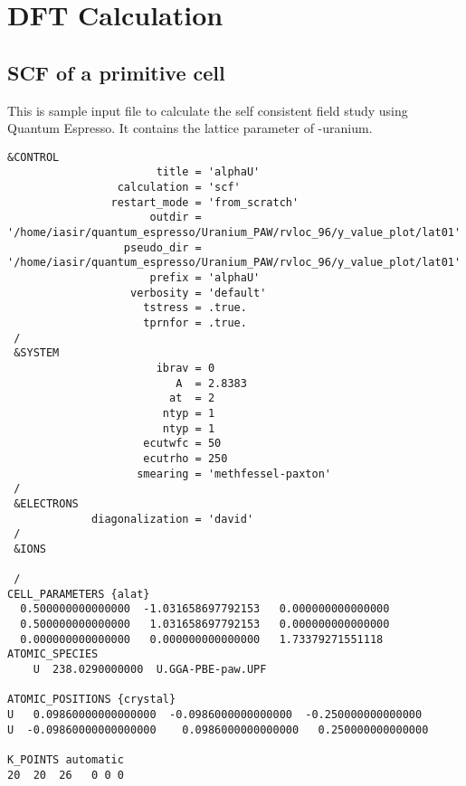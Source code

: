 \section{DFT Calculation}
\subsection{SCF of a primitive cell}
This is sample input file to calculate the self consistent field study using Quantum Espresso. It contains the lattice parameter of \textalpha-uranium.
\lstset{style=deflt}
\begin{lstlisting}
&CONTROL
                       title = 'alphaU'
                 calculation = 'scf'
                restart_mode = 'from_scratch'
                      outdir = '/home/iasir/quantum_espresso/Uranium_PAW/rvloc_96/y_value_plot/lat01'
                  pseudo_dir = '/home/iasir/quantum_espresso/Uranium_PAW/rvloc_96/y_value_plot/lat01'
                      prefix = 'alphaU'
                   verbosity = 'default'
                     tstress = .true.
                     tprnfor = .true.
 /
 &SYSTEM
                       ibrav = 0 
                          A  = 2.8383
                         at  = 2 
                        ntyp = 1 
                        ntyp = 1 
                     ecutwfc = 50
                     ecutrho = 250 
                    smearing = 'methfessel-paxton'
 /
 &ELECTRONS
             diagonalization = 'david'
 /
 &IONS

 /
CELL_PARAMETERS {alat}
  0.500000000000000  -1.031658697792153   0.000000000000000 
  0.500000000000000   1.031658697792153   0.000000000000000 
  0.000000000000000   0.000000000000000   1.73379271551118
ATOMIC_SPECIES
    U  238.0290000000  U.GGA-PBE-paw.UPF

ATOMIC_POSITIONS {crystal}
U   0.09860000000000000  -0.0986000000000000  -0.250000000000000 
U  -0.09860000000000000    0.0986000000000000   0.250000000000000  

K_POINTS automatic
20  20  26   0 0 0 

\end{lstlisting}

\pagebreak
